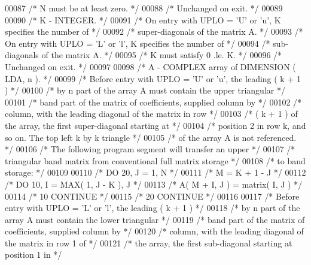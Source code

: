 \begin{DoxyCode}
00087 \textcolor{comment}{/*           N must be at least zero. */}
00088 \textcolor{comment}{/*           Unchanged on exit. */}
00089 
00090 \textcolor{comment}{/*  K      - INTEGER. */}
00091 \textcolor{comment}{/*           On entry with UPLO = 'U' or 'u', K specifies the number of */}
00092 \textcolor{comment}{/*           super-diagonals of the matrix A. */}
00093 \textcolor{comment}{/*           On entry with UPLO = 'L' or 'l', K specifies the number of */}
00094 \textcolor{comment}{/*           sub-diagonals of the matrix A. */}
00095 \textcolor{comment}{/*           K must satisfy  0 .le. K. */}
00096 \textcolor{comment}{/*           Unchanged on exit. */}
00097 
00098 \textcolor{comment}{/*  A      - COMPLEX          array of DIMENSION ( LDA, n ). */}
00099 \textcolor{comment}{/*           Before entry with UPLO = 'U' or 'u', the leading ( k + 1 ) */}
00100 \textcolor{comment}{/*           by n part of the array A must contain the upper triangular */}
00101 \textcolor{comment}{/*           band part of the matrix of coefficients, supplied column by */}
00102 \textcolor{comment}{/*           column, with the leading diagonal of the matrix in row */}
00103 \textcolor{comment}{/*           ( k + 1 ) of the array, the first super-diagonal starting at */}
00104 \textcolor{comment}{/*           position 2 in row k, and so on. The top left k by k triangle */}
00105 \textcolor{comment}{/*           of the array A is not referenced. */}
00106 \textcolor{comment}{/*           The following program segment will transfer an upper */}
00107 \textcolor{comment}{/*           triangular band matrix from conventional full matrix storage */}
00108 \textcolor{comment}{/*           to band storage: */}
00109 
00110 \textcolor{comment}{/*                 DO 20, J = 1, N */}
00111 \textcolor{comment}{/*                    M = K + 1 - J */}
00112 \textcolor{comment}{/*                    DO 10, I = MAX( 1, J - K ), J */}
00113 \textcolor{comment}{/*                       A( M + I, J ) = matrix( I, J ) */}
00114 \textcolor{comment}{/*              10    CONTINUE */}
00115 \textcolor{comment}{/*              20 CONTINUE */}
00116 
00117 \textcolor{comment}{/*           Before entry with UPLO = 'L' or 'l', the leading ( k + 1 ) */}
00118 \textcolor{comment}{/*           by n part of the array A must contain the lower triangular */}
00119 \textcolor{comment}{/*           band part of the matrix of coefficients, supplied column by */}
00120 \textcolor{comment}{/*           column, with the leading diagonal of the matrix in row 1 of */}
00121 \textcolor{comment}{/*           the array, the first sub-diagonal starting at position 1 in */}

\end{DoxyCode}
